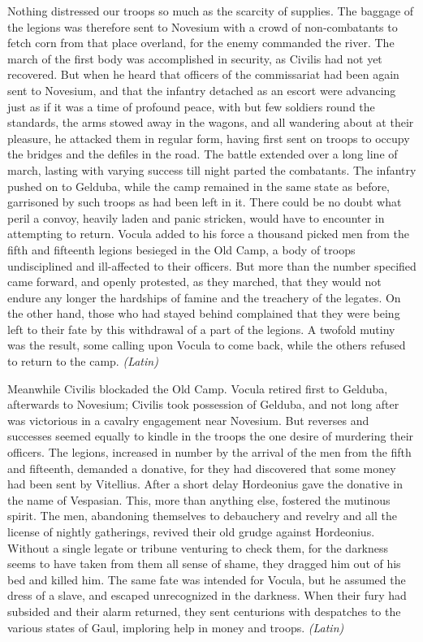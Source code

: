
Nothing distressed our troops so much as the scarcity of supplies. The baggage of the legions was therefore sent to Novesium with a crowd of non-combatants to fetch corn from that place overland, for the enemy commanded the river. The march of the first body was accomplished in security, as Civilis had not yet recovered. But when he heard that officers of the commissariat had been again sent to Novesium, and that the infantry detached as an escort were advancing just as if it was a time of profound peace, with but few soldiers round the standards, the arms stowed away in the wagons, and all wandering about at their pleasure, he attacked them in regular form, having first sent on troops to occupy the bridges and the defiles in the road. The battle extended over a long line of march, lasting with varying success till night parted the combatants. The infantry pushed on to Gelduba, while the camp remained in the same state as before, garrisoned by such troops as had been left in it. There could be no doubt what peril a convoy, heavily laden and panic stricken, would have to encounter in attempting to return. Vocula added to his force a thousand picked men from the fifth and fifteenth legions besieged in the Old Camp, a body of troops undisciplined and ill-affected to their officers. But more than the number specified came forward, and openly protested, as they marched, that they would not endure any longer the hardships of famine and the treachery of the legates. On the other hand, those who had stayed behind complained that they were being left to their fate by this withdrawal of a part of the legions. A twofold mutiny was the result, some calling upon Vocula to come back, while the others refused to return to the camp. \emph{(Latin)}


Meanwhile Civilis blockaded the Old Camp. Vocula retired first to Gelduba, afterwards to Novesium; Civilis took possession of Gelduba, and not long after was victorious in a cavalry engagement near Novesium. But reverses and successes seemed equally to kindle in the troops the one desire of murdering their officers. The legions, increased in number by the arrival of the men from the fifth and fifteenth, demanded a donative, for they had discovered that some money had been sent by Vitellius. After a short delay Hordeonius gave the donative in the name of Vespasian. This, more than anything else, fostered the mutinous spirit. The men, abandoning themselves to debauchery and revelry and all the license of nightly gatherings, revived their old grudge against Hordeonius. Without a single legate or tribune venturing to check them, for the darkness seems to have taken from them all sense of shame, they dragged him out of his bed and killed him. The same fate was intended for Vocula, but he assumed the dress of a slave, and escaped unrecognized in the darkness. When their fury had subsided and their alarm returned, they sent centurions with despatches to the various states of Gaul, imploring help in money and troops. \emph{(Latin)}

